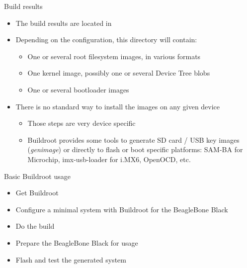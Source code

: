 \begin{frame}{Build results}
  \begin{itemize}
  \item The build results are located in 
  \item Depending on the configuration, this directory will contain:
    \begin{itemize}
    \item One or several root filesystem images, in various formats
    \item One kernel image, possibly one or several Device Tree blobs
    \item One or several bootloader images
    \end{itemize}
  \item There is no standard way to install the images on any given
    device
    \begin{itemize}
    \item Those steps are very device specific
    \item Buildroot provides some tools to generate SD card / USB key
      images ({\em genimage}) or directly to flash or boot specific
      platforms: SAM-BA for Microchip, imx-usb-loader for i.MX6, OpenOCD,
      etc.
    \end{itemize}
  \end{itemize}
\end{frame}

\setuplabframe
{Basic Buildroot usage}
{
  \begin{itemize}
  \item Get Buildroot
  \item Configure a minimal system with Buildroot for the BeagleBone
    Black
  \item Do the build
  \item Prepare the BeagleBone Black for usage
  \item Flash and test the generated system
  \end{itemize}
}
